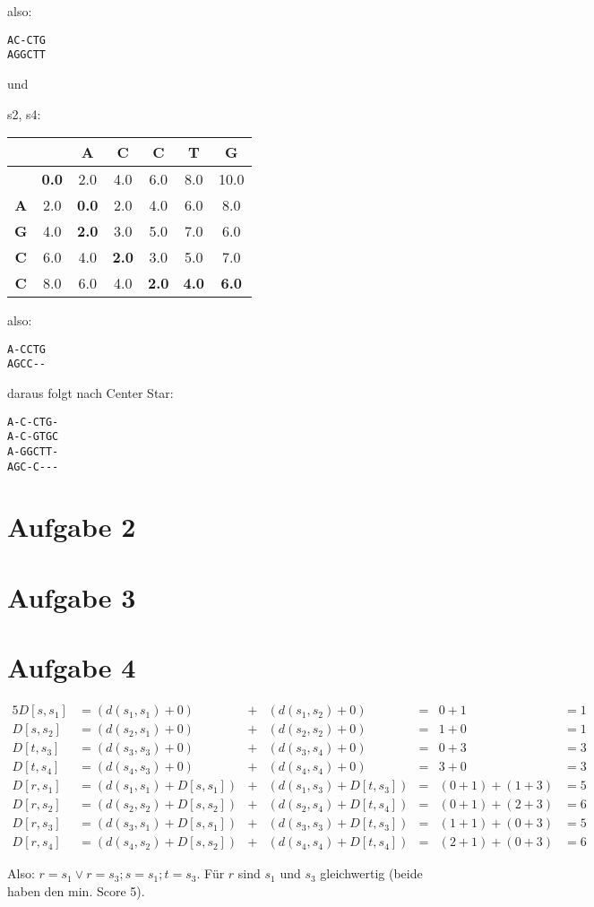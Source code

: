 \documentclass[a4paper,10pt,oneside,reqno]{scrartcl}
\begin{document}
also:
\begin{verbatim}
AC-CTG
AGGCTT
\end{verbatim}

und

s2, s4: \\
\begin{tabular}{c|cccccc}
& \textbf{ } & \textbf{A} & \textbf{C} & \textbf{C} & \textbf{T} & \textbf{G}\\\hline
\textbf{ } & \textbf{0.0} & 2.0 & 4.0 & 6.0 & 8.0 & 10.0\\
\textbf{A} & 2.0 & \textbf{0.0} & 2.0 & 4.0 & 6.0 & 8.0\\
\textbf{G} & 4.0 & \textbf{2.0} & 3.0 & 5.0 & 7.0 & 6.0\\
\textbf{C} & 6.0 & 4.0 & \textbf{2.0} & 3.0 & 5.0 & 7.0\\
\textbf{C} & 8.0 & 6.0 & 4.0 & \textbf{2.0} & \textbf{4.0} & \textbf{6.0}\\
\end{tabular}

also:
\begin{verbatim}
A-CCTG
AGCC--
\end{verbatim}

daraus folgt nach Center Star:

\begin{verbatim}
A-C-CTG-
A-C-GTGC
A-GGCTT-
AGC-C---
\end{verbatim}

\section*{Aufgabe 2}%

\section*{Aufgabe 3}%


\section*{Aufgabe 4}%

\begin{alignat}{5}
 D[s, s_1] &= (d(s_1,s_1)+0) &+{}& (d(s_1,s_2)+0) &=& 0 + 1 &= 1\\
 D[s, s_2] &= (d(s_2,s_1)+0) &+{}& (d(s_2,s_2)+0) &=& 1 + 0 &= 1\\\hline 
 D[t, s_3] &= (d(s_3,s_3)+0) &+{}& (d(s_3,s_4)+0) &=& 0 + 3 &= 3\\
 D[t, s_4] &= (d(s_4,s_3)+0) &+{}& (d(s_4,s_4)+0) &=& 3 + 0 &= 3\\\hline
 D[r, s_1] &= (d(s_1,s_1)+D[s, s_1]) &+{}& (d(s_1,s_3)+D[t, s_3]) &=& (0+1) + (1+3) &= 5\\
 D[r, s_2] &= (d(s_2,s_2)+D[s, s_2]) &+{}& (d(s_2,s_4)+D[t, s_4]) &=& (0+1) + (2+3) &= 6\\
 D[r, s_3] &= (d(s_3,s_1)+D[s, s_1]) &+{}& (d(s_3,s_3)+D[t, s_3]) &=& (1+1) + (0+3) &= 5\\
 D[r, s_4] &= (d(s_4,s_2)+D[s, s_2]) &+{}& (d(s_4,s_4)+D[t, s_4]) &=& (2+1) + (0+3) &= 6
\end{alignat}

Also: $r = s_1 \vee r = s_3 ; s = s_1 ; t = s_3$. Für $r$ sind $s_1$ und $s_3$ gleichwertig (beide haben den min. Score 5).
\end{document}
